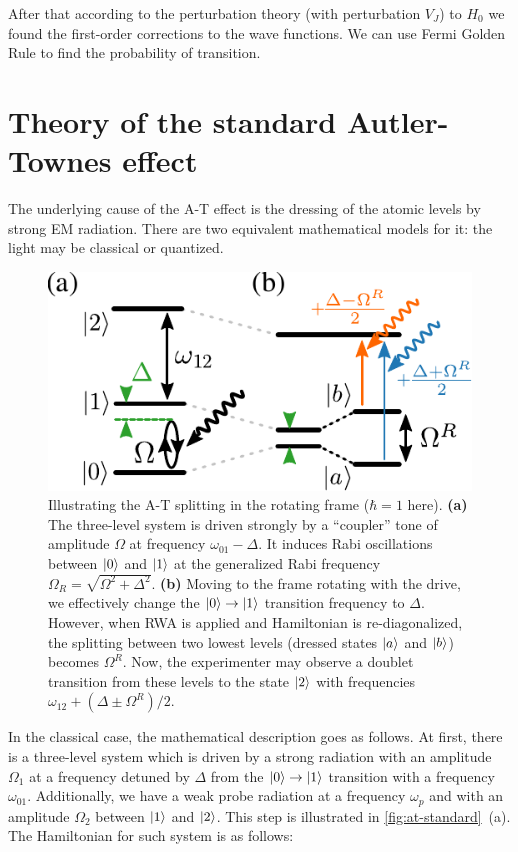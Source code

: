 \documentclass[%
 aip,
 amsmath,amssymb,
 reprint,%
]{revtex4-1}
\begin{document}
After that according to the perturbation theory (with perturbation $V_J$) to $H_0$ we found the first-order corrections to the wave functions. We can use Fermi Golden Rule to find the probability of transition.
\appendix

\section{Theory of the standard Autler-Townes effect}

The underlying cause of the A-T effect is the dressing of the atomic levels by strong EM radiation. There are two equivalent mathematical models for it: the light may be classical or quantized.

\begin{figure}
	\includegraphics[width=\linewidth]{intro_scheme}
	\caption{Illustrating the A-T splitting in the rotating frame ($\hbar=1$ here). \textbf{(a)} The three-level system is driven strongly by a ``coupler'' tone of amplitude $\Omega$ at frequency $\omega_{01}-\Delta$. It induces Rabi oscillations between $\ket{0}$ and $\ket{1}$ at the generalized Rabi frequency $\Omega_R = \sqrt{\Omega^2 + \Delta^2}$. \textbf{(b)} Moving to the frame rotating with the drive, we effectively change the $\ket{0}\rightarrow \ket{1}$ transition frequency to $\Delta$. However, when RWA is applied and Hamiltonian is re-diagonalized, the splitting between two lowest levels (dressed states $\ket{a}$ and $\ket{b}$) becomes $\Omega^R$. Now, the experimenter may observe a doublet transition from these levels to the state $\ket{2}$ with frequencies $\omega_{12}+(\Delta \pm \Omega^R)/2$.} 
	\label{fig:at-standard}
\end{figure}

In the classical case, the mathematical description goes as follows. At first, there is a three-level system which is driven by a strong radiation with an amplitude $\Omega_1$ at a frequency detuned by $\Delta$ from the $\ket{0}\rightarrow \ket{1}$ transition with a frequency $\omega_{01}$. Additionally, we have a weak probe radiation at a frequency $\omega_{p}$ and with an amplitude $\Omega_2$ between $\ket{1}$ and $\ket{2}$. This step is illustrated in \autoref{fig:at-standard}~(a). The Hamiltonian for such system is as follows:
\end{document}
